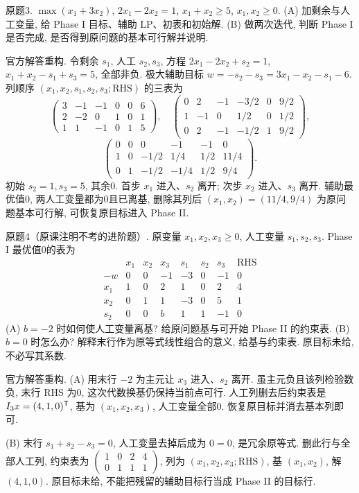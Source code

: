 \begin{exercise}\label{ass:15053-rec3-q3}
原题3. $\max(x_1+3x_2)$, $2x_1-2x_2=1$, $x_1+x_2\ge5$, $x_1,x_2\ge0$.
(A) 加剩余与人工变量, 给 Phase I 目标、辅助 LP、初表和初始解. (B) 做两次迭代, 判断 Phase I 是否完成, 是否得到原问题的基本可行解并说明.
\end{exercise}
\begin{solution}
官方解答重构. 令剩余 $s_1$, 人工 $s_2,s_3$, 方程 $2x_1-2x_2+s_2=1$, $x_1+x_2-s_1+s_3=5$, 全部非负. 极大辅助目标 $w=-s_2-s_3=3x_1-x_2-s_1-6$. 列顺序 $(x_1,x_2,s_1,s_2,s_3;\mathrm{RHS})$ 的三表为
\[
\begin{pmatrix}3&-1&-1&0&0&6\\2&-2&0&1&0&1\\1&1&-1&0&1&5\end{pmatrix},\quad
\begin{pmatrix}0&2&-1&-3/2&0&9/2\\1&-1&0&1/2&0&1/2\\0&2&-1&-1/2&1&9/2\end{pmatrix},
\]
\[
\begin{pmatrix}0&0&0&-1&-1&0\\1&0&-1/2&1/4&1/2&11/4\\0&1&-1/2&-1/4&1/2&9/4\end{pmatrix}.
\]
初始 $s_2=1,s_3=5$, 其余0. 首步 $x_1$ 进入、$s_2$ 离开; 次步 $x_2$ 进入、$s_3$ 离开. 辅助最优值0, 两人工变量都为0且已离基, 删除其列后 $(x_1,x_2)=(11/4,9/4)$ 为原问题基本可行解, 可恢复原目标进入 Phase II.
\end{solution}

\begin{exercise}\label{ass:15053-rec3-q4}
原题4（原课注明不考的进阶题）. 原变量 $x_1,x_2,x_3\ge0$, 人工变量 $s_1,s_2,s_3$. Phase I 最优值0的表为
\[
\begin{array}{c|rrrrrr|r}
&x_1&x_2&x_3&s_1&s_2&s_3&\mathrm{RHS}\\\hline
-w&0&0&-1&-3&0&-1&0\\
x_1&1&0&2&1&0&2&4\\
x_2&0&1&1&-3&0&5&1\\
s_2&0&0&b&1&1&-1&0
\end{array}
\]
(A) $b=-2$ 时如何使人工变量离基? 给原问题基与可开始 Phase II 的约束表. (B) $b=0$ 时怎么办? 解释末行作为原等式线性组合的意义, 给基与约束表. 原目标未给, 不必写其系数.
\end{exercise}
\begin{solution}
官方解答重构. (A) 用末行 $-2$ 为主元让 $x_3$ 进入、$s_2$ 离开. 虽主元负且该列检验数负, 末行 RHS 为0, 这次代数换基仍保持当前点可行. 人工列删去后约束表是 $I_3x=(4,1,0)^{\mathsf T}$, 基为 $(x_1,x_2,x_3)$, 人工变量全部0. 恢复原目标并消去基本列即可.

(B) 末行 $s_1+s_2-s_3=0$, 人工变量去掉后成为 $0=0$, 是冗余原等式. 删此行与全部人工列, 约束表为
$\left(\begin{smallmatrix}1&0&2&4\\0&1&1&1\end{smallmatrix}\right)$, 列为 $(x_1,x_2,x_3;\mathrm{RHS})$, 基 $(x_1,x_2)$, 解 $(4,1,0)$. 原目标未给, 不能把残留的辅助目标行当成 Phase II 的目标行.
\end{solution}

